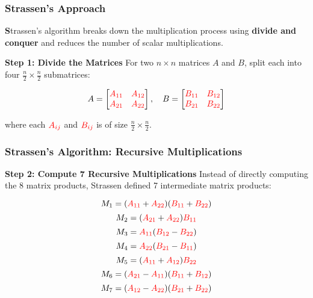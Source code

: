 \begin{frame}
    \frametitle{Strassen’s Approach}

    \textbf  
    Strassen’s algorithm breaks down the multiplication process using \textbf{divide and conquer} and reduces the number of scalar multiplications.

    \vspace{0.5cm}
    \textbf{Step 1: Divide the Matrices}  
    For two \( n \times n \) matrices \( A \) and \( B \), split each into four \( \frac{n}{2} \times \frac{n}{2} \) submatrices:

    \[
    A =
    \begin{bmatrix}
        \textcolor{red}{A_{11}} & \textcolor{red}{A_{12}} \\
        \textcolor{red}{A_{21}} & \textcolor{red}{A_{22}}
    \end{bmatrix}
    , \quad
    B =
    \begin{bmatrix}
        \textcolor{red}{B_{11}} & \textcolor{red}{B_{12}} \\
        \textcolor{red}{B_{21}} & \textcolor{red}{B_{22}}
    \end{bmatrix}
    \]

    where each \( \textcolor{red}{A_{ij}} \) and \( \textcolor{red}{B_{ij}} \) is of size \( \frac{n}{2} \times \frac{n}{2} \).

    
\end{frame}

\begin{frame}
    \frametitle{Strassen’s Algorithm: Recursive Multiplications}

    \textbf{Step 2: Compute 7 Recursive Multiplications}  
    Instead of directly computing the 8 matrix products, Strassen defined 7 intermediate matrix products:

   \[
    M_1 = (\textcolor{red}{A_{11}} + \textcolor{red}{A_{22}}) (\textcolor{red}{B_{11}} + \textcolor{red}{B_{22}})
\]
\[
    M_2 = (\textcolor{red}{A_{21}} + \textcolor{red}{A_{22}}) \textcolor{red}{B_{11}}
\]
\[
    M_3 = \textcolor{red}{A_{11}} (\textcolor{red}{B_{12}} - \textcolor{red}{B_{22}})
\]
\[
    M_4 = \textcolor{red}{A_{22}} (\textcolor{red}{B_{21}} - \textcolor{red}{B_{11}})
\]
\[
    M_5 = (\textcolor{red}{A_{11}} + \textcolor{red}{A_{12}}) \textcolor{red}{B_{22}}
\]
\[
    M_6 = (\textcolor{red}{A_{21}} - \textcolor{red}{A_{11}}) (\textcolor{red}{B_{11}} + \textcolor{red}{B_{12}})
\]
\[
    M_7 = (\textcolor{red}{A_{12}} - \textcolor{red}{A_{22}}) (\textcolor{red}{B_{21}} + \textcolor{red}{B_{22}})
\]


\end{frame}

